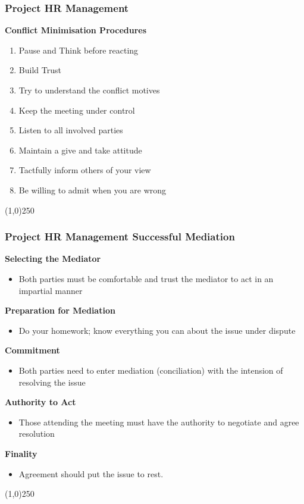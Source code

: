  

 
 
 
 
 
\begin{frame}
\frametitle{Project HR Management}
\textbf{Conflict Minimisation Procedures}
\begin{enumerate}
	\item Pause and Think before reacting
	\item Build Trust
	\item Try to understand the conflict motives
	\item Keep the meeting under control
	\item Listen to all involved parties
	\item Maintain a give and take attitude
	\item Tactfully inform others of your view
	\item Be willing to admit when you are wrong
\end{enumerate}
\end{frame}\begin{center}\line(1,0){250}\end{center}
 

\begin{frame}
\frametitle{Project HR Management \hfill Successful Mediation}
\textbf{Selecting the Mediator}
\begin{itemize}
	\item Both parties must be comfortable and trust the mediator to act in an impartial manner
\end{itemize}
\textbf{Preparation for Mediation} 
\begin{itemize}
	\item Do your homework; know everything you can about the issue under dispute
\end{itemize}
\textbf{Commitment}
\begin{itemize}
	\item Both parties need to enter mediation (conciliation) with the intension of resolving the issue
\end{itemize}
\textbf{Authority to Act}
\begin{itemize}
	\item Those attending the meeting must have the authority to negotiate and agree resolution	
\end{itemize}
\textbf{Finality}
\begin{itemize}
	\item Agreement should put the issue to rest.
\end{itemize}
\end{frame}\begin{center}\line(1,0){250}\end{center}



